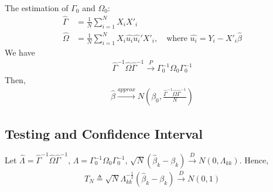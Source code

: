 \documentclass[11pt]{elegantbook}
\begin{document}
The estimation of $\Gamma_0$ and $\Omega_0$:
\begin{equation}
    \begin{aligned}
        \hat{\Gamma}&=\frac{1}{N}\sum_{i=1}^N X_i X'_i\\
        \hat{\Omega}&=\frac{1}{N}\sum_{i=1}^N X_i\hat{u_i}\hat{u_i}'X'_i,\quad \text{where }\hat{u_i}=Y_i-X'_i\hat{\beta}
    \end{aligned}
    \nonumber
\end{equation}
We have
\begin{equation}
    \begin{aligned}
        \hat{\Gamma}^{-1}\hat{\Omega}\hat{\Gamma}^{-1}\xrightarrow{P} \Gamma_0^{-1}\Omega_0 \Gamma_0^{-1}
    \end{aligned}
    \nonumber
\end{equation}
Then,
\begin{equation}
    \begin{aligned}
        \hat{\beta}\xrightarrow{approx}N\left(\beta_0,\frac{\hat{\Gamma}^{-1}\hat{\Omega}\hat{\Gamma}^{-1}}{N}\right)
    \end{aligned}
    \nonumber
\end{equation}

\subsection{Testing and Confidence Interval}
Let $\hat{\Lambda}=\hat{\Gamma}^{-1}\hat{\Omega}\hat{\Gamma}^{-1}$, $\Lambda=\Gamma_0^{-1}\Omega_0 \Gamma_0^{-1}$, $\sqrt{N}(\hat{\beta}_k-\beta_k) \xrightarrow{D} N\left(0,\Lambda_{kk}\right)$. Hence,
\begin{equation}
    \begin{aligned}
        T_N\triangleq \sqrt{N}\Lambda_{kk}^{-\frac{1}{2}}\left(\hat{\beta}_k-\beta_k\right)\xrightarrow{D} N(0,1)
    \end{aligned}
    \nonumber
\end{equation}
\end{document}
